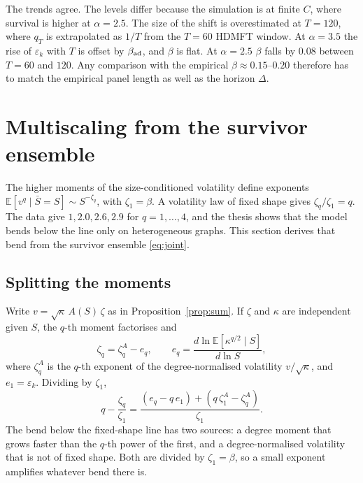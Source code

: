 \documentclass[11pt]{article}
\newcommand{\E}{\mathbb E}
\theoremstyle{remark}
\begin{document}
The trends agree.  The levels differ because the simulation is at finite $C$, where survival
is higher at $\alpha=2.5$.  The size of the shift is overestimated at $T=120$, where $q_T$ is
extrapolated as $1/T$ from the $T=60$ HDMFT window.  At $\alpha=3.5$ the rise of
$\varepsilon_k$ with $T$ is offset by $\beta_{\rm ad}$, and $\beta$ is flat.  At $\alpha=2.5$
$\beta$ falls by $0.08$ between $T=60$ and $120$.  Any comparison with the empirical
$\beta\approx0.15$--$0.20$ therefore has to match the empirical panel length as well as the
horizon $\Delta$.

\section{Multiscaling from the survivor ensemble}
\label{sec:multiscaling}

The higher moments of the size-conditioned volatility define exponents
$\E[v^q\mid\bar S=S]\sim S^{-\zeta_q}$, with $\zeta_1=\beta$.  A volatility law of fixed shape
gives $\zeta_q/\zeta_1=q$.  The data give $1,2.0,2.6,2.9$ for $q=1,\dots,4$, and the thesis shows
that the model bends below the line only on heterogeneous graphs.  This section derives that
bend from the survivor ensemble \eqref{eq:joint}.

\subsection{Splitting the moments}

Write $v=\sqrt\kappa\,A(S)\,\zeta$ as in Proposition~\ref{prop:sum}.  If $\zeta$ and $\kappa$ are
independent given $S$, the $q$-th moment factorises and
\begin{equation}
  \zeta_q=\zeta_q^A-e_q,
  \qquad
  e_q=\frac{d\ln\E[\kappa^{q/2}\mid S]}{d\ln S},
  \label{eq:zeta-split}
\end{equation}
where $\zeta_q^A$ is the $q$-th exponent of the degree-normalised volatility $v/\sqrt\kappa$, and
$e_1=\varepsilon_k$.  Dividing by $\zeta_1$,
\begin{equation}
  q-\frac{\zeta_q}{\zeta_1}
  =\frac{(e_q-q\,e_1)+(q\,\zeta_1^A-\zeta_q^A)}{\zeta_1}.
  \label{eq:bend}
\end{equation}
The bend below the fixed-shape line has two sources: a degree moment that grows faster than the
$q$-th power of the first, and a degree-normalised volatility that is not of fixed shape.  Both
are divided by $\zeta_1=\beta$, so a small exponent amplifies whatever bend there is.
\end{document}
